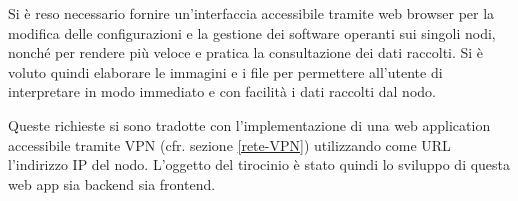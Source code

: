 Si è reso necessario fornire un'interfaccia accessibile tramite web browser per la modifica delle configurazioni e la gestione dei software operanti sui singoli nodi, nonché per rendere più veloce e pratica la consultazione dei dati raccolti. Si è voluto quindi elaborare le immagini e i file per permettere all'utente di interpretare in modo immediato e con facilità i dati raccolti dal nodo.

Queste richieste si sono tradotte con l'implementazione di una web application accessibile tramite VPN (cfr. sezione \ref{rete-VPN}) utilizzando come URL l'indirizzo IP del nodo. L'oggetto del tirocinio è stato quindi lo sviluppo di questa web app sia backend sia frontend.